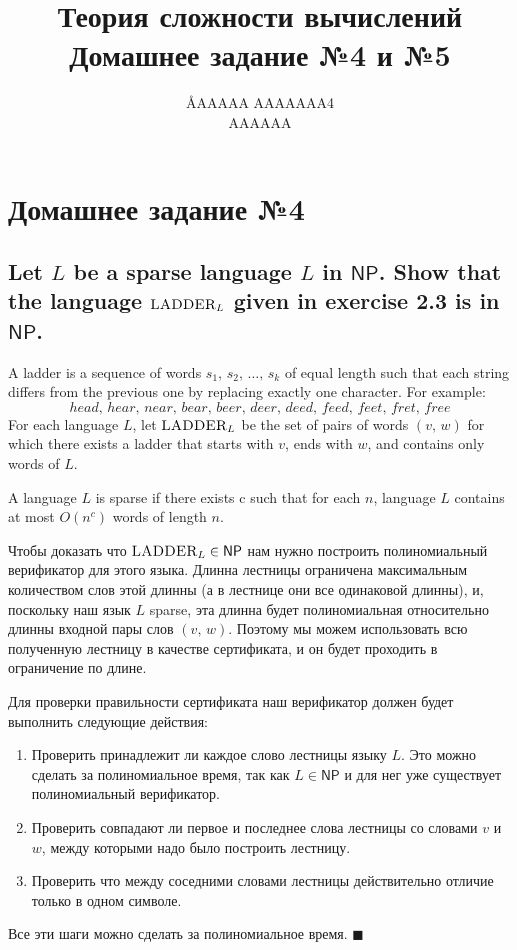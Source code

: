 \documentclass{article}
\title{Теория сложности вычислений \\ Домашнее задание №4 и №5}
\author{\AA{AAAAA AAAAAAA}{4} \\ AAAAAA}
\newcommand{\NP}{\ensuremath{\mathsf{NP}}}
\begin{document}
  \maketitle

  \setcounter{section}{3}
  \section{Домашнее задание №4}
  \setcounter{subsection}{10}
  \subsection{Let $L$ be a sparse language $L$ in \NP. Show that the language $\textsc{LADDER}_L$ given in exercise 2.3 is in \NP.}
  \begin{centerframebox}
    A ladder is a sequence of words $s_1,\, s_2,\, \dots,\, s_k$ of equal length such that each string differs from the previous one by replacing exactly one character.
    For example: $$head,\, hear,\, near,\, bear,\, beer,\, deer,\, deed,\, feed,\, feet,\, fret,\, free$$
    For each language $L$, let $\textsc{LADDER}_L$ be the set of pairs of words $(v,\, w)$ for which there exists a ladder that starts with $v$, ends with $w$, and contains only words of $L$. \vspace{5mm}

    A language $L$ is sparse if there exists c such that for each $n$, language $L$ contains at most $O(n^c)$ words of length $n$.
  \end{centerframebox}
  Чтобы доказать что $\textsc{LADDER}_L \in \NP$ нам нужно построить полиномиальный верификатор для этого языка.
  Длинна лестницы ограничена максимальным количеством слов этой длинны (а в лестнице они все одинаковой длинны), и, поскольку наш язык $L$ sparse, эта длинна будет полиномиальная относительно длинны входной пары слов $(v,\, w)$.
  Поэтому мы можем использовать всю полученную лестницу в качестве сертификата, и он будет проходить в ограничение по длине.

  \noindent
  Для проверки правильности сертификата наш верификатор должен будет выполнить следующие действия:
  \begin{enumerate}
    \item Проверить принадлежит ли каждое слово лестницы языку $L$. Это можно сделать за полиномиальное время, так как $L \in \NP$ и для нег уже существует полиномиальный верификатор.
    \item Проверить совпадают ли первое и последнее слова лестницы со словами $v$ и $w$, между которыми надо было построить лестницу.
    \item Проверить что между соседними словами лестницы действительно отличие только в одном символе.
  \end{enumerate}
  Все эти шаги можно сделать за полиномиальное время.
  $\blacksquare$
\end{document}
